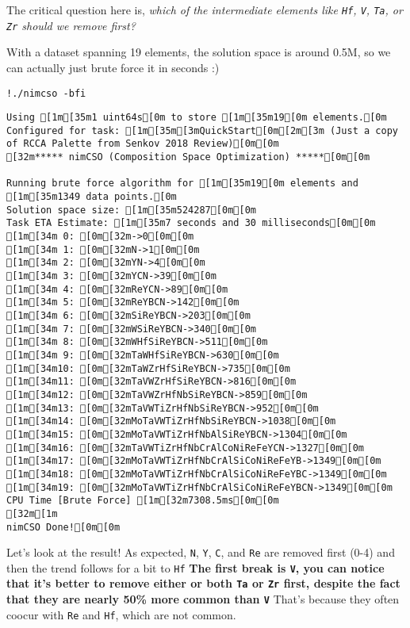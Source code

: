 The critical question here is, \emph{which of the intermediate elements
like \texttt{Hf}, \texttt{V},
\texttt{Ta}, or \texttt{Zr} should we
remove first?}

With a dataset spanning 19 elements, the solution space is around 0.5M,
so we can actually just brute force it in seconds :)

\begin{verbatim}
!./nimcso -bfi
\end{verbatim}

\begin{verbatim}
Using [1m[35m1 uint64s[0m to store [1m[35m19[0m elements.[0m
Configured for task: [1m[35m[3mQuickStart[0m[2m[3m (Just a copy of RCCA Palette from Senkov 2018 Review)[0m[0m
[32m***** nimCSO (Composition Space Optimization) *****[0m[0m

Running brute force algorithm for [1m[35m19[0m elements and [1m[35m1349 data points.[0m
Solution space size: [1m[35m524287[0m[0m
Task ETA Estimate: [1m[35m7 seconds and 30 milliseconds[0m[0m
[1m[34m 0: [0m[32m->0[0m[0m
[1m[34m 1: [0m[32mN->1[0m[0m
[1m[34m 2: [0m[32mYN->4[0m[0m
[1m[34m 3: [0m[32mYCN->39[0m[0m
[1m[34m 4: [0m[32mReYCN->89[0m[0m
[1m[34m 5: [0m[32mReYBCN->142[0m[0m
[1m[34m 6: [0m[32mSiReYBCN->203[0m[0m
[1m[34m 7: [0m[32mWSiReYBCN->340[0m[0m
[1m[34m 8: [0m[32mWHfSiReYBCN->511[0m[0m
[1m[34m 9: [0m[32mTaWHfSiReYBCN->630[0m[0m
[1m[34m10: [0m[32mTaWZrHfSiReYBCN->735[0m[0m
[1m[34m11: [0m[32mTaVWZrHfSiReYBCN->816[0m[0m
[1m[34m12: [0m[32mTaVWZrHfNbSiReYBCN->859[0m[0m
[1m[34m13: [0m[32mTaVWTiZrHfNbSiReYBCN->952[0m[0m
[1m[34m14: [0m[32mMoTaVWTiZrHfNbSiReYBCN->1038[0m[0m
[1m[34m15: [0m[32mMoTaVWTiZrHfNbAlSiReYBCN->1304[0m[0m
[1m[34m16: [0m[32mTaVWTiZrHfNbCrAlCoNiReFeYCN->1327[0m[0m
[1m[34m17: [0m[32mMoTaVWTiZrHfNbCrAlSiCoNiReFeYB->1349[0m[0m
[1m[34m18: [0m[32mMoTaVWTiZrHfNbCrAlSiCoNiReFeYBC->1349[0m[0m
[1m[34m19: [0m[32mMoTaVWTiZrHfNbCrAlSiCoNiReFeYBCN->1349[0m[0m
CPU Time [Brute Force] [1m[32m7308.5ms[0m[0m
[32m[1m
nimCSO Done![0m[0m
\end{verbatim}

Let's look at the result! As expected, \texttt{N},
\texttt{Y}, \texttt{C}, and
\texttt{Re} are removed first (0-4) and then the trend
follows for a bit to \texttt{Hf} \textbf{The first
break is \texttt{V}, you can notice that it's better to
remove either or both \texttt{Ta} or
\texttt{Zr} first, despite the fact that they are
nearly 50\% more common than \texttt{V}} That's
because they often coocur with \texttt{Re} and
\texttt{Hf}, which are not common.

